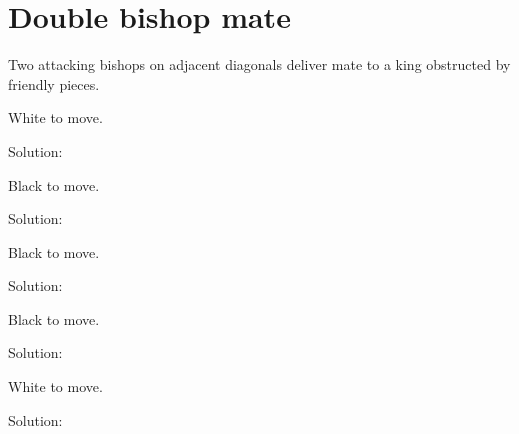 \documentclass{book}
\begin{document}
\section{Double bishop mate}
Two attacking bishops on adjacent diagonals deliver mate to a king obstructed by friendly pieces.\begin{multicols}{2} 
\begin{samepage} 
\newgame 


 
\showboard
 
 White to move. 
 
Solution: 
 
\end{samepage}\begin{samepage} 
\newgame 


 
\showboard
 
 Black to move. 
 
Solution: 
 
\end{samepage}\begin{samepage} 
\newgame 


 
\showboard
 
 Black to move. 
 
Solution: 
 
\end{samepage}\begin{samepage} 
\newgame 


 
\showboard
 
 Black to move. 
 
Solution: 
 
\end{samepage}\begin{samepage} 
\newgame 


 
\showboard
 
 White to move. 
 
Solution: 
 
\end{samepage}\end{multicols} 
\newpage 
\end{document}
